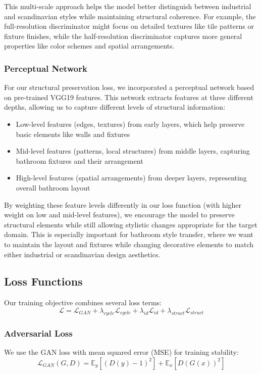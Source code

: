 \documentclass[twocolumn,superscriptaddress,aps]{revtex4-1}
\begin{document}
This multi-scale approach helps the model better distinguish between industrial and scandinavian styles while maintaining structural coherence. For example, the full-resolution discriminator might focus on detailed textures like tile patterns or fixture finishes, while the half-resolution discriminator captures more general properties like color schemes and spatial arrangements.

\subsubsection{Perceptual Network}

For our structural preservation loss, we incorporated a perceptual network based on pre-trained VGG19 features. This network extracts features at three different depths, allowing us to capture different levels of structural information:

\begin{itemize}
    \item Low-level features (edges, textures) from early layers, which help preserve basic elements like walls and fixtures
    \item Mid-level features (patterns, local structures) from middle layers, capturing bathroom fixtures and their arrangement
    \item High-level features (spatial arrangements) from deeper layers, representing overall bathroom layout
\end{itemize}

By weighting these feature levels differently in our loss function (with higher weight on low and mid-level features), we encourage the model to preserve structural elements while still allowing stylistic changes appropriate for the target domain. This is especially important for bathroom style transfer, where we want to maintain the layout and fixtures while changing decorative elements to match either industrial or scandinavian design aesthetics.

\subsection{Loss Functions}
Our training objective combines several loss terms:
\begin{equation}
\mathcal{L} = \mathcal{L}_{GAN} + \lambda_{cycle}\mathcal{L}_{cycle} + \lambda_{id}\mathcal{L}_{id} + \lambda_{struct}\mathcal{L}_{struct}
\end{equation}

\subsubsection{Adversarial Loss}
We use the GAN loss with mean squared error (MSE) for training stability:
\begin{equation}
\mathcal{L}_{GAN}(G, D) = \mathbb{E}_{y}[(D(y) - 1)^2] + \mathbb{E}_{x}[D(G(x))^2]
\end{equation}
\end{document}
